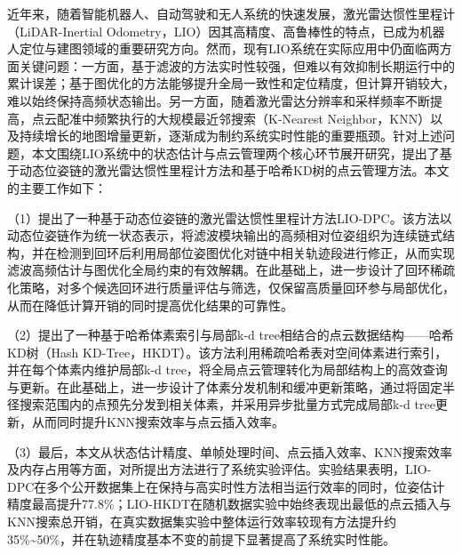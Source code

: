 \begin{cabstract}	%
近年来，随着智能机器人、自动驾驶和无人系统的快速发展，激光雷达惯性里程计（LiDAR-Inertial Odometry，LIO）因其高精度、高鲁棒性的特点，已成为机器人定位与建图领域的重要研究方向。然而，现有LIO系统在实际应用中仍面临两方面关键问题：一方面，基于滤波的方法实时性较强，但难以有效抑制长期运行中的累计误差；基于图优化的方法能够提升全局一致性和定位精度，但计算开销较大，难以始终保持高频状态输出。另一方面，随着激光雷达分辨率和采样频率不断提高，点云配准中频繁执行的大规模最近邻搜索（K-Nearest Neighbor，KNN）以及持续增长的地图增量更新，逐渐成为制约系统实时性能的重要瓶颈。针对上述问题，本文围绕LIO系统中的状态估计与点云管理两个核心环节展开研究，提出了基于动态位姿链的激光雷达惯性里程计方法和基于哈希KD树的点云管理方法。本文的主要工作如下：

（1）提出了一种基于动态位姿链的激光雷达惯性里程计方法LIO-DPC。该方法以动态位姿链作为统一状态表示，将滤波模块输出的高频相对位姿组织为连续链式结构，并在检测到回环后利用局部位姿图优化对链中相关轨迹段进行修正，从而实现滤波高频估计与图优化全局约束的有效解耦。在此基础上，进一步设计了回环稀疏化策略，对多个候选回环进行质量评估与筛选，仅保留高质量回环参与局部优化，从而在降低计算开销的同时提高优化结果的可靠性。

（2）提出了一种基于哈希体素索引与局部k-d tree相结合的点云数据结构——哈希KD树（Hash KD-Tree，HKDT）。该方法利用稀疏哈希表对空间体素进行索引，并在每个体素内维护局部k-d tree，将全局点云管理转化为局部结构上的高效查询与更新。在此基础上，进一步设计了体素分发机制和缓冲更新策略，通过将固定半径搜索范围内的点预先分发到相关体素，并采用异步批量方式完成局部k-d tree更新，从而同时提升KNN搜索效率与点云插入效率。

（3）最后，本文从状态估计精度、单帧处理时间、点云插入效率、KNN搜索效率及内存占用等方面，对所提出方法进行了系统实验评估。实验结果表明，LIO-DPC在多个公开数据集上在保持与高实时性方法相当运行效率的同时，位姿估计精度最高提升77.8\%；LIO-HKDT在随机数据实验中始终表现出最低的点云插入与KNN搜索总开销，在真实数据集实验中整体运行效率较现有方法提升约35\%\textasciitilde50\%，并在轨迹精度基本不变的前提下显著提高了系统实时性能。


\end{cabstract}

